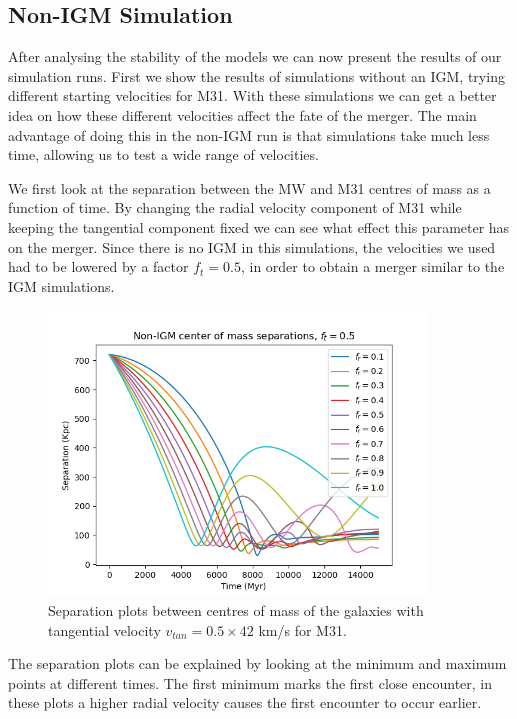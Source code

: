 \documentclass[a4paper,12pt, english]{article}
\begin{document}
\subsection{Non-IGM Simulation}
\label{non-igm-sim}
After analysing the stability of the models we can now present the results of our simulation runs. First we show the results of simulations without an IGM, trying different starting velocities for M31. With these simulations we can get a better idea on how these different velocities affect the fate of the merger. The main advantage of doing this in the non-IGM run is that simulations take much less time, allowing us to test a wide range of velocities.\par
\smallskip
We first look at the separation between the MW and M31 centres of mass as a function of time. By changing the radial velocity component of M31 while keeping the tangential component fixed we can see what effect this parameter has on the merger. Since there is no IGM in this simulations, the velocities we used had to be lowered by a factor \(f_t = 0.5\), in order to obtain a merger similar to the IGM simulations.\par
\begin{figure}[!h]
    \centering
    \includegraphics[width=0.9\textwidth]{separation/comparison_constant_transvel_noIGM.png}
    \caption{Separation plots between centres of mass of the galaxies with tangential velocity $v_{tan}=0.5\times 42$ km/s for M31.}
    \label{fig:No-IGM-Separation-Trans-constant}
\end{figure}
\smallskip
The separation plots can be explained by looking at the minimum and maximum points at different times. The first minimum marks the first close encounter, in these plots a higher radial velocity causes the first encounter to occur earlier.\par
\end{document}
